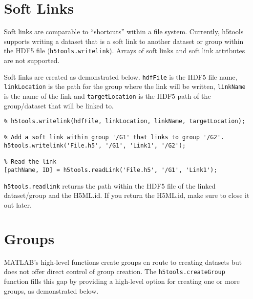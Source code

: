 \documentclass[11pt]{exam}
\newcommand\myfcn[1]{\colorbox{codegray}{\textcolor{codeblue}{\texttt{#1}}}}
\begin{document}
                                             

    \section{Soft Links}\label{sec:links}
    	\noindent Soft links are comparable to ``shortcuts'' within a file system. Currently, h5tools supports writing a dataset that is a soft link to another dataset or group within the HDF5 file (\myfcn{h5tools.writelink}). Arrays of soft links and soft link attributes are not supported.
        
        Soft links are created as demonstrated below. \texttt{hdfFile} is the HDF5 file name, \texttt{linkLocation} is the path for the group where the link will be written, \texttt{linkName} is the name of the link and \texttt{targetLocation} is the HDF5 path of the group/dataset that will be linked to.
    \begin{lstlisting}[style=matlab-editor, basicstyle=\mlttfamily\footnotesize]
% SYNTAX:
% h5tools.writelink(hdfFile, linkLocation, linkName, targetLocation);

% Add a soft link within group '/G1' that links to group '/G2'.
h5tools.writelink('File.h5', '/G1', 'Link1', '/G2');

% Read the link
[pathName, ID] = h5tools.readLink('File.h5', '/G1', 'Link1');
    \end{lstlisting}
    \myfcn{h5tools.readlink} returns the path within the HDF5 file of the linked dataset/group and the H5ML.id. If you return the H5ML.id, make sure to close it out later. 

                                                       

	\section{Groups}\label{sec:groups}
		\noindent MATLAB's high-level functions create groups en route to creating datasets but does not offer direct control of group creation. The \myfcn{h5tools.createGroup} function fills this gap by providing a high-level option for creating one or more groups, as demonstrated below.
\end{document}
